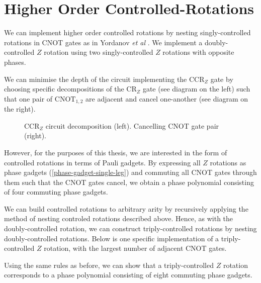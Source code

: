 \section{Higher Order Controlled-Rotations}

We can implement higher order controlled rotations by nesting singly-controlled rotations in CNOT gates as in Yordanov \textit{et al} \cite{Yordanov2020}. We implement a doubly-controlled $Z$ rotation using two singly-controlled $Z$ rotations with opposite phases.


We can minimise the depth of the circuit implementing the CCR$_Z$ gate by choosing specific decompositions of the CR$_Z$ gate (see diagram on the left) such that one pair of $\text{CNOT}_{1, 2}$ are adjacent and cancel one-another (see diagram on the right).

\begin{figure}[H]
    \centering
    \caption{CCR$_Z$ circuit decomposition (left). Cancelling CNOT gate pair (right).}
\end{figure}

However, for the purposes of this thesis, we are interested in the form of controlled rotations in terms of Pauli gadgets. By expressing all $Z$ rotations as phase gadgets (\ref{phase-gadget-single-leg}) and commuting all CNOT gates through them such that the CNOT gates cancel, we obtain a phase polynomial consisting of four commuting phase gadgets.


We can build controlled rotations to arbitrary arity by recursively applying the method of nesting controled rotations described above. Hence, as with the doubly-controlled rotation, we can construct triply-controlled rotations by nesting doubly-controlled rotations. Below is one specific implementation of a triply-controlled $Z$ rotation, with the largest number of adjacent CNOT gates.


Using the same rules as before, we can show that a triply-controlled $Z$ rotation corresponds to a phase polynomial consisting of eight commuting phase gadgets.


